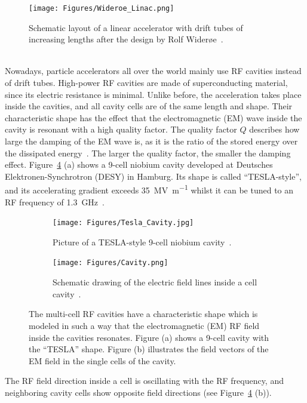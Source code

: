 \begin{figure}
\centering
\texttt{[image: Figures/Wideroe\_Linac.png]}
\caption[Schematic layout of a Wider\o e linac]{Schematic layout of a linear accelerator with drift tubes of increasing lengths after the design by Rolf Wider\o e~\cite[p. 40]{Hinterberger}.}
\label{fig:Wideroe_Linac}
\end{figure}
\\
Nowadays, particle accelerators all over the world mainly use RF cavities instead of drift tubes.
High-power RF cavities are made of superconducting material, since its electric resistance is minimal.
Unlike before, the acceleration takes place inside the cavities, and all cavity cells are of the same length and shape.
Their characteristic shape has the effect that the electromagnetic (EM) wave inside the cavity is resonant with a high quality factor.
The quality factor $Q$ describes how large the damping of the EM wave is, as it is the ratio of the stored energy over the dissipated energy~\cite[p. 148]{Wilson}.
The larger the quality factor, the smaller the damping effect.
Figure~\ref{fig:Cavities} (a) shows a 9-cell niobium cavity developed at Deutsches Elektronen-Synchrotron (DESY) in Hamburg.
Its shape is called ``TESLA-style'', and its accelerating gradient exceeds \SI{35}{\mega\volt\per\meter} whilst it can be tuned to an RF frequency of \SI{1.3}{\giga\hertz}~\cite[p. 15f]{TDR31}.
\begin{figure}
\begin{subfigure}[b]{0.49\textwidth}
\centering
 \texttt{[image: Figures/Tesla\_Cavity.jpg]}
\caption[Tesla-style 9-cell cavity]{Picture of a TESLA-style 9-cell niobium cavity~\cite[p. 15]{TDR31}.}
\label{fig:Tesla_Cavity}
\end{subfigure}\hfill
\begin{subfigure}[b]{0.49\textwidth}
\centering
 \texttt{[image: Figures/Cavity.png]}
\caption[Electric field in a cell cavity]{Schematic drawing of the electric field lines inside a cell cavity~\cite[p. 47]{Desy_SummerStudent_Lecture}.}
\label{fig:Cavity}
\end{subfigure}
\caption[RF cavities]{The multi-cell RF cavities have a characteristic shape which is modeled in such a way that the electromagnetic (EM) RF field inside the cavities resonates. Figure (a) shows a 9-cell cavity with the ``TESLA'' shape. Figure (b) illustrates the field vectors of the EM field in the single cells of the cavity.}
\label{fig:Cavities}
\end{figure}
The RF field direction inside a cell is oscillating with the RF frequency, and neighboring cavity cells show opposite field directions (see Figure~\ref{fig:Cavities} (b)).
